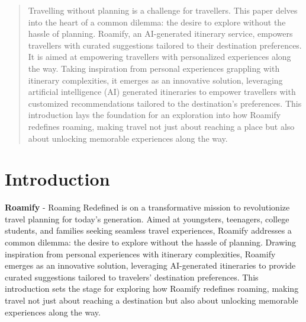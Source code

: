 \documentclass[conference]{IEEEtran}
\begin{document}




\maketitle


\begin{abstract}

Travelling without planning is a challenge for travellers. This paper delves into the heart of a common dilemma: the desire to explore without the hassle of planning. Roamify, an AI-generated itinerary service, empowers travellers with curated suggestions tailored to their destination preferences. It is aimed at empowering travellers with personalized experiences along the way. Taking inspiration from personal experiences grappling with itinerary complexities, it emerges as an innovative solution, leveraging artificial intelligence (AI) generated itineraries to empower travellers with customized recommendations tailored to the destination's preferences. This introduction lays the foundation for an exploration into how Roamify redefines roaming, making travel not just about reaching a place but also about unlocking memorable experiences along the way.


\end{abstract}


\IEEEpeerreviewmaketitle



\section{Introduction}
    
    \textbf{Roamify} - Roaming Redefined is on a transformative mission to revolutionize travel planning for today's generation. Aimed at youngsters, teenagers, college students, and families seeking seamless travel experiences, Roamify addresses a common dilemma: the desire to explore without the hassle of planning. Drawing inspiration from personal experiences with itinerary complexities, Roamify emerges as an innovative solution, leveraging AI-generated itineraries to provide curated suggestions tailored to travelers' destination preferences. This introduction sets the stage for exploring how Roamify redefines roaming, making travel not just about reaching a destination but also about unlocking memorable experiences along the way.
    
\end{document}
